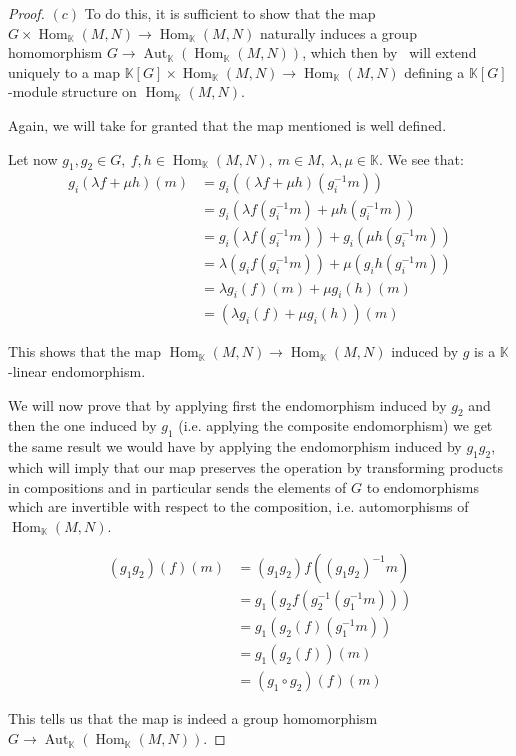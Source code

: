 \documentclass{article}
\newcommand{\numberset}{\mathbb}
\newcommand{\K}{\numberset{K}}
\DeclareMathOperator{\Hom}{Hom}
\DeclareMathOperator{\Aut}{Aut}
\begin{document}
\begin{proof}
	$(c)$ To do this, it is sufficient to show that the map $G\times\Hom_{\K}(M,N)\rightarrow\Hom_{\K}(M,N)$ naturally induces a group homomorphism $G\rightarrow\Aut_{\K}(\Hom_{\K}(M,N))$, which then by~\cite[lemma 4.2]{Tor10} will extend uniquely to a map $\K[G]\times\Hom_{\K}(M,N)\rightarrow\Hom_{\K}(M,N)$ defining a $\K[G]$-module structure on $\Hom_{\K}(M,N)$.
	
	Again, we will take for granted that the map mentioned is well defined.
	
	Let now $g_1,g_2\in G,\ f,h\in\Hom_{\K}(M,N),\ m\in M,\ \lambda,\mu\in\K$. We see that:
	\begin{align*}
		g_i(\lambda f+\mu h)(m) &=g_i((\lambda f+\mu h)(g_i^{-1}m)) \\
		&=g_i(\lambda f(g_i^{-1}m)+\mu h(g_i^{-1}m)) \\
		&=g_i(\lambda f(g_i^{-1}m))+g_i(\mu h(g_i^{-1}m)) \\
		&=\lambda (g_if(g_i^{-1}m))+\mu (g_ih(g_i^{-1}m)) \\
		&=\lambda g_i(f)(m)+\mu g_i(h)(m) \\
		&=(\lambda g_i(f)+\mu g_i(h))(m)
	\end{align*}
	
	This shows that the map $\Hom_{\K}(M,N)\rightarrow\Hom_{\K}(M,N)$ induced by $g$ is a $\K$-linear endomorphism.
	
	We will now prove that by applying first the endomorphism induced by $g_2$ and then the one induced by $g_1$ (i.e. applying the composite endomorphism) we get the same result	we would have by applying the endomorphism induced by $g_1g_2$, which will imply that our map preserves the operation by transforming products in compositions and in particular sends the elements of $G$ to endomorphisms which are invertible with respect to the composition, i.e. automorphisms of $\Hom_{\K}(M,N)$.
	
	\begin{align*}
		(g_1g_2)(f)(m) &=(g_1g_2)f((g_1g_2)^{-1}m) \\
		&=g_1(g_2f(g_2^{-1}(g_1^{-1}m))) \\
		&=g_1(g_2(f)(g_1^{-1}m)) \\
		&=g_1(g_2(f))(m) \\
		&=(g_1\circ g_2)(f)(m)
	\end{align*}
	
	This tells us that the map is indeed a group homomorphism $G\rightarrow\Aut_{\K}(\Hom_{\K}(M,N))$.
\end{proof}
\end{document}
